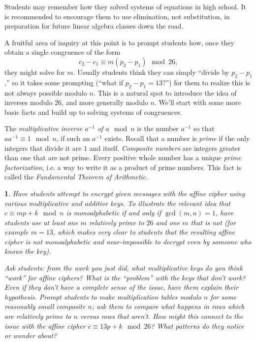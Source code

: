 \documentclass[11pt]{article}
\theoremstyle{plain}
\theoremstyle{remark}
\theoremstyle{definition}
\theoremstyle{definition}
\theoremstyle{definition}
\theoremstyle{plain}
\theoremstyle{plain}
\theoremstyle{plain}
\newtheorem{act}[thm]{\protect\activityname}
\theoremstyle{definition}
\providecommand{\activityname}{Activity}
\begin{document}
Students may remember how they solved systems of equations in high
school. It is recommended to encourage them to use elimination, not substitution,
in preparation for future linear algebra classes down the road. 

A fruitful area of inquiry at this point is to prompt students how,
once they obtain a single congruence of the form 
\[
c_{2}-c_{1}\equiv m(p_{2}-p_{1})\mod26,
\]
they might solve for $m$. Usually students think they can simply
``divide by $p_{2}-p_{1}$,'' so it takes some prompting (``what if
$p_{2}-p_{1}=13$?'') for them to realize this is not always possible
modulo $n$. This is a natural spot to introduce the idea of inverses
modulo $26$, and more generally modulo $n$. We'll start with some
more basic facts and build up to solving systems of congruences. 

The \textit{multiplicative inverse $a^{-1}$ of $a\mod n$ }is the
number $a^{-1}$ so that $aa^{-1}\equiv1\mod n$, if such an $a^{-1}$
exists. Recall that a number is \textit{prime} if the only integers
that divide it are $1$ and itself. \textit{Composite numbers} are
integers greater than one that are not prime. Every positive whole
number has a unique \textit{prime factorization}, i.e. a way to write
it as a product of prime numbers. This fact is called the \textit{Fundamental
Theorem of Arithmetic.}

\begin{act}
Have students attempt to encrypt given messages with the affine cipher
using various multiplicative and additive keys. To illustrate the
relevant idea that $c\equiv mp+k\mod n$ is monoalphabetic if and
only if $\gcd(m,n)=1$, have students use at least one $m$ relatively
prime to $26$ and one $m$ that is not (for example $m=13$, which
makes very clear to students that the resulting affine cipher is not
monoalphabetic and near-impossible to decrypt even by someone who
knows the key).

Ask students: from the work you just did, what multiplicative keys
do you think ``work'' for affine ciphers? What is the
``problem'' with the keys that don't work? Even if they
don't have a complete sense of the issue, have them explain their hypothesis.
Prompt students to make multiplication tables modulo $n$ for some
reasonably small composite $n$; ask them to compare what happens
in rows which are relatively prime to $n$ versus rows that aren't.
How might this connect to the issue with the affine cipher $c\equiv13p+k\mod26$?
What patterns do they notice or wonder about?
\end{act}
\end{document}
